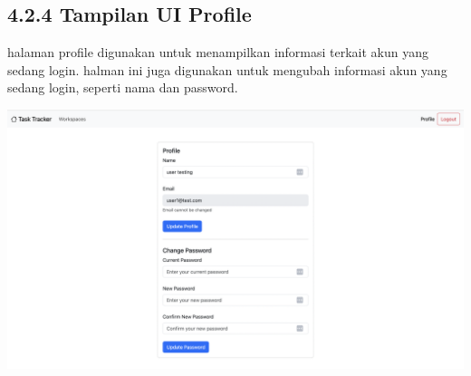 \subsection*{4.2.4 Tampilan UI Profile}
halaman profile digunakan untuk menampilkan informasi terkait akun yang sedang login.
halman ini juga digunakan untuk mengubah informasi akun yang sedang login, seperti nama dan password.
\begin{center}
  \includegraphics[width=1\textwidth]{assets/ui/edit_profile.png}
\end{center}



